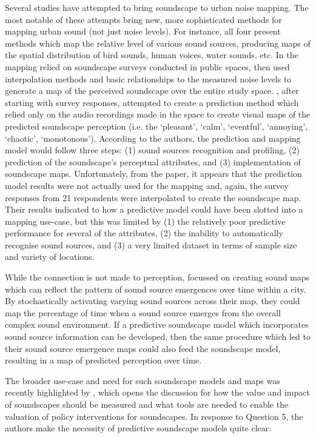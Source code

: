 Several studies have attempted to bring soundscape to urban noise mapping. The most notable of these attempts \citep{Aletta2015Soundscape,Hong2017Exploring,Aumond2018Probabilistic,Kang2018model} bring new, more sophisticated methods for mapping urban sound (not just noise levels). For instance, all four present methods which map the relative level of various sound sources, producing maps of the spatial distribution of bird sounds, human voices, water sounds, etc. In \citet{Aletta2015Soundscape,Hong2017Exploring} the mapping relied on soundscape surveys conducted in public spaces, then used interpolation methods and basic relationships to the measured noise levels to generate a map of the perceived soundscape over the entire study space. \citet{Kang2018model}, after starting with survey responses, attempted to create a prediction method which relied only on the audio recordings made in the space to create visual maps of the predicted soundscape perception (i.e. the  `pleasant', `calm', `eventful', `annoying', `chaotic', `monotonous'). According to the authors, the prediction and mapping model would follow three steps: (1) sound sources recognition and profiling, (2) prediction of the soundscape's perceptual attributes, and (3) implementation of soundscape maps. Unfortunately, from the paper, it appears that the prediction model results were not actually used for the mapping and, again, the survey responses from 21 respondents were interpolated to create the soundscape map. Their results indicated to how a predictive model could have been slotted into a mapping use-case, but this was limited by (1) the relatively poor predictive performance for several of the attributes, (2) the inability to automatically recognise sound sources, and (3) a very limited dataset in terms of sample size and variety of locations.

While the connection is not made to perception, \citet{Aumond2018Probabilistic} focussed on creating sound maps which can reflect the pattern of sound source emergences over time within a city. By stochastically activating varying sound sources across their map, they could map the percentage of time when a sound source emerges from the overall complex sound environment. If a predictive soundscape model which incorporates sound source information can be developed, then the same procedure which led to their sound source emergence maps could also feed the soundscape model, resulting in a map of predicted perception over time. 

The broader use-case and need for such soundscape models and maps was recently highlighted by \citet{Jiang2022Ten}, which opens the discussion for how the value and impact of soundscapes should be measured and what tools are needed to enable the valuation of policy interventions for soundscapes. In response to Question 5, the authors make the necessity of predictive soundscape models quite clear:

